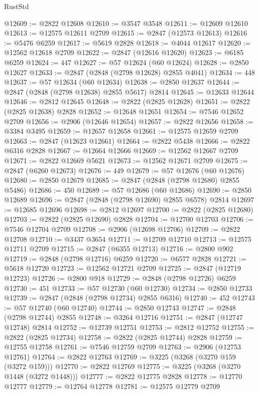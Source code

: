 \begin{lexlean}{RustStd}
\begin{coremodule}
@12609 := @2822 @12608
@12610 := @3547 @3548
@12611 := @12609 @12610
@12613 := @12575 @12611 @2709
@12615 := @2847 (@12573 @12613)
@12616 := @5476 @6259
@12617 := @5619 @2828
@12618 := @4044 @12617
@12620 := @12562 @12618 @2709
@12622 := @2847 (@12616 @12620)
@12623 := @6185 @6259
@12624 := 447
@12627 := @57 @12624 (@60 @12624)
@12628 := @2850 @12627
@12633 := @2847 (@2848 (@2798 @12628) @2855 @4041)
@12634 := 448
@12637 := @57 @12634 (@60 @12634)
@12638 := @2850 @12637
@12644 := @2847 (@2848 (@2798 @12638) @2855 @5617) @2814
@12645 := @12633 @12644
@12646 := @2812 @12645
@12648 := @2822 (@2825 @12628)
@12651 := @2822 (@2825 @12638) @2828
@12652 := @12648 @12651
@12654 := @7546 @12652 @2709
@12656 := @2906 (@12646 @12654)
@12657 := @2822 @12656
@12658 := @3384 @3495
@12659 := @12657 @12658
@12661 := @12575 @12659 @2709
@12663 := @2847 (@12623 @12661)
@12664 := @2822 @5438
@12666 := @2822 @6316 @2828
@12667 := @12664 @12666
@12669 := @12562 @12667 @2709
@12671 := @2822 @12669 @5621
@12673 := @12562 @12671 @2709
@12675 := @2847 (@6260 @12673)
@12676 := 449
@12679 := @57 @12676 (@60 @12676)
@12680 := @2850 @12679
@12685 := @2847 (@2848 (@2798 @12680) @2855 @5486)
@12686 := 450
@12689 := @57 @12686 (@60 @12686)
@12690 := @2850 @12689
@12696 := @2847 (@2848 (@2798 @12690) @2855 @6578) @2814
@12697 := @12685 @12696
@12698 := @2812 @12697
@12700 := @2822 (@2825 @12680)
@12703 := @2822 (@2825 @12690) @2828
@12704 := @12700 @12703
@12706 := @7546 @12704 @2709
@12708 := @2906 (@12698 @12706)
@12709 := @2822 @12708
@12710 := @3437 @3654
@12711 := @12709 @12710
@12713 := @12575 @12711 @2709
@12715 := @2847 (@6355 @12713)
@12716 := @2800 @902
@12719 := @2848 (@2798 @12716) @6259
@12720 := @6577 @2828
@12721 := @5618 @12720
@12723 := @12562 @12721 @2709
@12725 := @2847 (@12719 @12723)
@12726 := @2800 @918
@12729 := @2848 (@2798 @12726) @6259
@12730 := 451
@12733 := @57 @12730 (@60 @12730)
@12734 := @2850 @12733
@12739 := @2847 (@2848 (@2798 @12734) @2855 @6316)
@12740 := 452
@12743 := @57 @12740 (@60 @12740)
@12744 := @2850 @12743
@12747 := @2848 (@2798 @12744) @2855
@12748 := @3264 @12716
@12751 := @2847 (@12747 @12748) @2814
@12752 := @12739 @12751
@12753 := @2812 @12752
@12755 := @2822 (@2825 @12734)
@12758 := @2822 (@2825 @12744) @2828
@12759 := @12755 @12758
@12761 := @7546 @12759 @2709
@12763 := @2906 (@12753 @12761)
@12764 := @2822 @12763
@12769 := @3225 (@3268 (@3270 @159 (@3272 @159)))
@12770 := @2822 @12769
@12775 := @3225 (@3268 (@3270 @1448 (@3272 @1448)))
@12777 := @2822 @12775 @2828
@12778 := @12770 @12777
@12779 := @12764 @12778
@12781 := @12575 @12779 @2709

\end{coremodule}
\end{lexlean}
